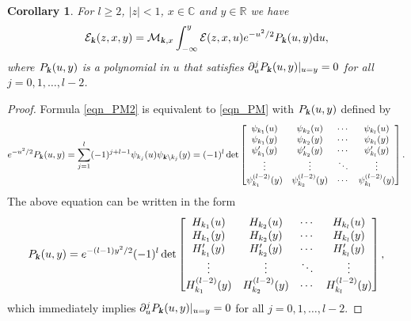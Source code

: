 \documentclass[12pt]{article}
\def\E{{\mathcal E}}
\def\r{{\mathbb R}}
\def\c{{\mathbb C}}
\def\d{{\textnormal d}}
\def\k{\textbf{\textsl{k}}}
\newtheorem{corollary}{Corollary}
\begin{document}
\begin{corollary}\label{Corollary1}
For $l\geqslant 2$,  $|z|<1$, $x\in \c$ and $y\in \r$  we have
\begin{equation}\label{eqn_PM2}
\E_{\k}(z,x,y)=  
{\mathcal M}_{\k,x}  \int_{-\infty}^y  \E(z,x,u) e^{-u^2/2} P_{\k}(u,y) \d u,
\end{equation}
where $P_{\k}(u,y)$ is a polynomial in $u$ that satisfies $\partial_u^j P_{\k}(u,y) |_{u=y}=0$ for all $j=0,1,\dots,l-2$. 
\end{corollary}
\begin{proof}
Formula \eqref{eqn_PM2} is equivalent to \eqref{eqn_PM} with $P_{\k}(u,y)$ defined by
\[
e^{-u^2/2} P_{\k}(u,y)=\sum\limits_{j=1}^l (-1)^{j+l-1}  \psi_{k_j}(u) \psi_{\k \setminus k_j}(y)=(-1)^l \det \begin{bmatrix}
\psi_{k_1}(u) & \psi_{k_2}(u) & \cdots & \psi_{k_{l}}(u)\\
\psi_{k_1}(y) & \psi_{k_2}(y) & \cdots & \psi_{k_{l}}(y)\\
\psi_{k_1}'(y) & \psi_{k_2}'(y) & \cdots & \psi_{k_{l}}'(y)\\
\vdots & \vdots & \ddots & \vdots\\
\psi_{k_1}^{(l-2)}(y) & \psi_{k_2}^{(l-2)}(y) & \cdots & \psi_{k_{l}}^{(l-2)}(y)
\end{bmatrix}.
\]
The above equation can be written in the form
\[
P_{\k}(u,y)=e^{-(l-1)y^2/2} (-1)^l \det\begin{bmatrix}
H_{k_1}(u) & H_{k_2}(u) & \cdots & H_{k_{l}}(u)\\
H_{k_1}(y) & H_{k_2}(y) & \cdots & H_{k_{l}}(y)\\
H_{k_1}'(y) & H_{k_2}'(y) & \cdots & H_{k_{l}}'(y)\\
\vdots & \vdots & \ddots & \vdots\\
H_{k_1}^{(l-2)}(y) & H_{k_2}^{(l-2)}(y) & \cdots & H_{k_{l}}^{(l-2)}(y)
\end{bmatrix},
\]
which immediately implies 
$\partial_u^j P_{\k}(u,y) |_{u=y}=0$ for all $j=0,1,\dots,l-2$. 
\end{proof}
\end{document}
